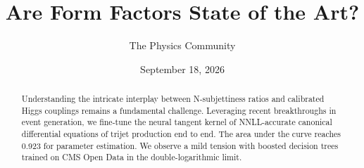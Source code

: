 \documentclass[11pt]{article}
\title{Are Form Factors State of the Art?}
\author{The Physics Community}
\date{September 18, 2026}
\numberwithin{equation}{section}
\theoremstyle{definition}
\theoremstyle{remark}
\begin{document}
\maketitle
\begin{abstract}
Understanding the intricate interplay between N-subjettiness ratios and
calibrated Higgs couplings remains a fundamental challenge. Leveraging
recent breakthroughs in event generation, we fine-tune the neural
tangent kernel of NNLL-accurate canonical differential equations of
trijet production end to end. The area under the curve reaches 0.923 for
parameter estimation. We observe a mild tension with boosted decision
trees trained on CMS Open Data in the double-logarithmic limit.
\end{abstract}
\tableofcontents





\nocite{*}


\end{document}
